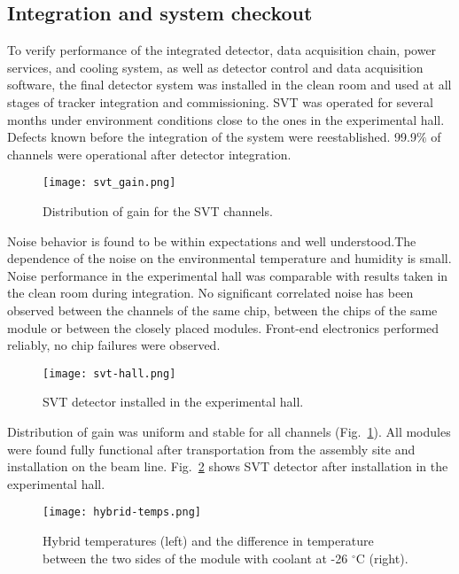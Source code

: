 \subsection{Integration and system checkout}

To verify performance of the integrated detector, data acquisition chain, power services, and cooling system, as well as detector control and data acquisition software, the final detector system was installed in the clean room and used at all stages of tracker integration and commissioning. SVT was operated for several months under environment conditions close to the ones in the experimental hall. Defects known before the integration of the system were reestablished. 99.9$\%$ of channels were operational after detector integration. 

\begin{figure}[hbt] 
\centering 
\texttt{[image: svt\_gain.png]}
\caption{Distribution of gain for the SVT channels.}
\label{fig:svt_gain}
\end{figure}

Noise behavior is found to be within expectations and well understood.The dependence of the noise on the environmental temperature and humidity is small. Noise performance in the experimental hall was comparable with results taken in the clean room during integration. No significant correlated noise has been observed between the channels of the same chip, between the chips of the same module or between the closely placed modules. Front-end electronics performed reliably, no chip failures were observed. 
 
\begin{figure}[hbt] 
\centering 
\texttt{[image: svt-hall.png]}
\caption{SVT detector installed in the experimental hall.}
\label{fig:svt-hall}
\end{figure}

Distribution of gain was uniform and stable for all channels (Fig.~\ref{fig:svt_gain}). All modules were found fully functional after transportation from the assembly site and installation on the beam line. Fig.~\ref{fig:svt-hall} shows SVT detector after installation in the experimental hall.

\begin{figure}[hbt] 
\centering 
\texttt{[image: hybrid-temps.png]}
\caption{Hybrid temperatures (left) and the difference in temperature between the two sides of the module with coolant at -26 $^\circ$C (right).}
\label{fig:hybrid-temps}
\end{figure}

